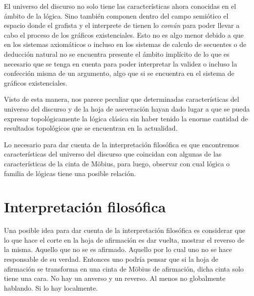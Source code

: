 \documentclass[
	fontsize=10pt, %
	twoside=false, %
	secnumdepth=1, %
	abstract=true, %
]{kaohandt}
\begin{document}
El universo del discurso no solo tiene las características ahora conocidas en el ámbito de la lógica. Sino también componen dentro del campo semiótico el espacio donde el grafista y el interprete de tienen lo \emph{común} para poder llevar a cabo el proceso de los gráficos existenciales. Esto no es algo menor debido a que en los sistemas axiomáticos o incluso en los sistemas de calculo de secuentes o de deducción natural no se encuentra presente el ámbito implícito de lo que es necesario que se tenga en cuenta para poder interpretar la validez o incluso la confección misma de un argumento, algo que si se encuentra en el sistema de gráficos existenciales.

Visto de esta manera, nos parece peculiar que determinadas características del universo del discurso y de la hoja de aseveración hayan dado lugar a que se pueda expresar topológicamente la lógica clásica sin haber tenido la enorme cantidad de resultados topológicos que se encuentran en la actualidad.

Lo necesario para dar cuenta de la interpretación filosófica es que encontremos características del universo del discurso que coincidan con algunas de las características de la cinta de Möbius, para luego, observar con cual lógica o familia de lógicas tiene una posible relación.


\section{Interpretación filosófica} %
\label{sec:Interpretación filosófica}

Una posible idea para dar cuenta de la interpretación filosófica es considerar que lo que hace el corte en la hoja de afirmación es dar vuelta, mostrar el reverso de la misma. Aquello que no se es afirmado. Aquello por lo cual uno no se hace responsable de su verdad. Entonces uno podría pensar que si la hoja de afirmación se transforma en una cinta de Möbius de afirmación, dicha cinta solo tiene una cara. No hay un anverso y un reverso. Al menos no globalmente hablando. Si lo hay localmente.  
\end{document}

